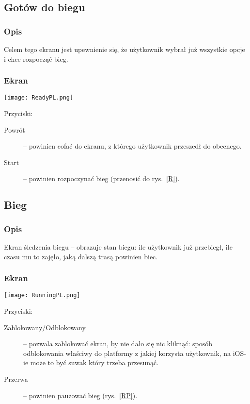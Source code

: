 \subsection{Gotów do biegu}
\subsubsection{Opis}
\noindent Celem tego ekranu jest upewnienie się, że użytkownik wybrał już wszystkie opcje i chce rozpocząć bieg. 
\subsubsection{Ekran}
\begin{minipage}{0.5\textwidth}
  \label{RR}
  \texttt{[image: ReadyPL.png]}
\end{minipage}
\begin{minipage}{0.5\textwidth}
Przyciski:\\
\begin{description}
  \item[Powrót] -- powinien cofać do ekranu, z którego użytkownik przeszedł do obecnego.
  \item[Start] -- powinien rozpoczynać bieg (przenosić do rys.~\ref{R}).
\end{description}
\end{minipage}
\subsection{Bieg}
\subsubsection{Opis}
\noindent Ekran śledzenia biegu -- obrazuje stan biegu: ile użytkownik już przebiegł, ile czasu mu to zajęło, jaką dalszą trasą powinien biec.
\subsubsection{Ekran}
\begin{minipage}{0.5\textwidth}
  \label{R}
  \texttt{[image: RunningPL.png]}
\end{minipage}
\begin{minipage}{0.5\textwidth}
Przyciski:\\
\begin{description}
  \item[Zablokowany/Odblokowany] -- pozwala zablokować ekran, by nie dało się nic kliknąć: sposób odblokowania właściwy do platformy z jakiej korzysta użytkownik, na iOS-ie może to być suwak który trzeba przesunąć.
  \item[Przerwa] -- powinien pauzować bieg (rys.~\ref{RP}).
\end{description}
\end{minipage}
